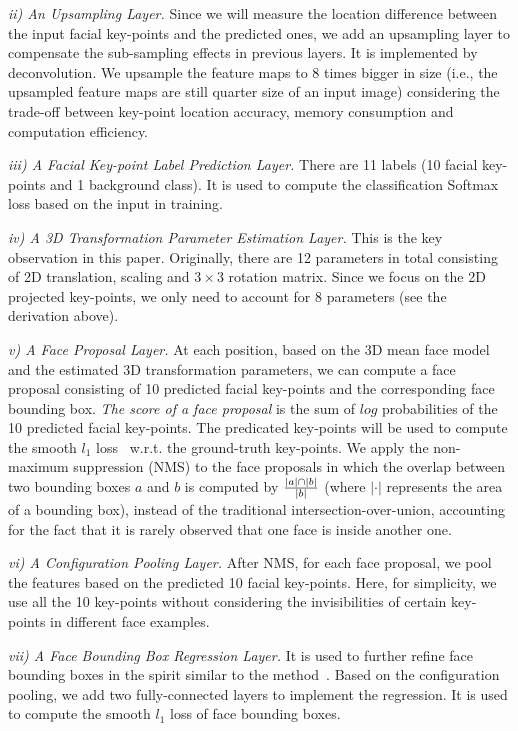\documentclass[runningheads]{llncs}
\begin{document}
 \textit{ii) An Upsampling Layer.} Since we will measure the location difference between the input facial key-points and the predicted ones, we add an upsampling layer to compensate the sub-sampling effects in previous layers. It is implemented by deconvolution. We upsample the feature maps to 8 times bigger in size (i.e., the upsampled feature maps are still quarter size of an input image) considering the trade-off between key-point location accuracy, memory consumption and computation efficiency.

\textit{iii) A Facial Key-point Label Prediction Layer.} There are 11 labels (10 facial key-points and 1 background class). It is used to compute the classification Softmax loss based on the input in training.

\textit{iv) A 3D Transformation Parameter Estimation Layer.} This is the key observation in this paper. Originally, there are 12 parameters in total consisting of 2D translation, scaling and $3\times 3$ rotation matrix. Since we focus on the 2D projected key-points, we only need to account for 8 parameters (see the derivation above).

 \textit{v) A Face Proposal Layer.} At each position, based on the 3D mean face model and the estimated 3D transformation parameters, we can compute a face proposal consisting of 10 predicted facial key-points and the corresponding face bounding box. \textit{The score of a face proposal} is the sum of $log$ probabilities of the 10 predicted facial key-points. The predicated key-points will be used to compute the smooth $l_1$ loss~\cite{FastRCNN} w.r.t. the ground-truth key-points. We apply the non-maximum suppression (NMS) to the face proposals in which the overlap between two bounding boxes $a$ and $b$ is computed by ${|a|\cap |b|}\over {|b|}$ (where $|\cdot|$ represents the area of a bounding box), instead of the traditional intersection-over-union, accounting for the fact that it is rarely observed that one face is inside another one.

 \textit{vi) A Configuration Pooling Layer.} After NMS, for each face proposal, we pool the features based on the predicted 10 facial key-points. Here, for simplicity, we use all the 10 key-points without considering the invisibilities of certain key-points in different face examples.

\textit{vii) A Face Bounding Box Regression Layer.} It is used to further refine face bounding boxes in the spirit similar to the method~\cite{FastRCNN}. Based on the configuration pooling, we add two fully-connected layers to implement the regression. It is used to compute the smooth $l_1$ loss of face bounding boxes.
\end{document}
